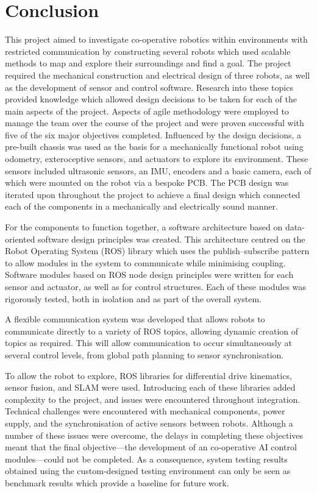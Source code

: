 
\chapter{Conclusion}\label{conclusion}
This project aimed to investigate co-operative robotics within environments
with restricted communication by constructing several robots
which used scalable methods to map and explore their surroundings and find
a goal. The project required the mechanical construction and
electrical design of three robots, as well as the development of sensor and
control software.  Research into these topics provided knowledge which allowed
design decisions to be taken for each of the main aspects of the project.
Aspects of agile methodology were employed to manage the team over the course of
the project and were proven successful with five of the six major objectives
completed. Influenced by the design decisions, a pre-built chassis was
used as the basis for a mechanically functional robot using odometry,
exteroceptive sensors, and actuators to explore its environment. These sensors
included ultrasonic sensors, an IMU, encoders and a basic
camera, each of which were mounted on the robot via a bespoke PCB. The PCB
design was iterated upon throughout the project to achieve a final design
which connected each of the components in a mechanically and
electrically sound manner.

For the components to function together, a software
architecture based on data-oriented software design principles was
created. This architecture centred on the Robot Operating System (ROS)
library which uses the publish--subscribe pattern to allow modules in the
system to communicate while minimising coupling. Software modules based on
ROS node design principles were written for each sensor and actuator, as well
as for control structures. Each of these modules was rigorously tested, both
in isolation and as part of the overall system.

A flexible communication system was developed that allows robots to communicate
directly to a variety of ROS topics, allowing dynamic creation of topics as required.
This will allow communication to occur simultaneously at several control levels,
from global path planning to sensor synchronisation.

To allow the robot to explore, ROS libraries for differential drive kinematics,
sensor fusion, and SLAM were used.
Introducing each of these libraries added complexity to the project, and
issues were encountered throughout integration. Technical challenges were
encountered with mechanical components, power supply, and the synchronisation of
active sensors between robots. Although a number of these
issues were overcome, the delays in completing these objectives meant that
the final objective---the development of an co-operative AI control modules---could
not be completed. As a consequence, system testing results obtained using the
custom-designed testing environment can only be seen as benchmark results which
provide a baseline for future work.

